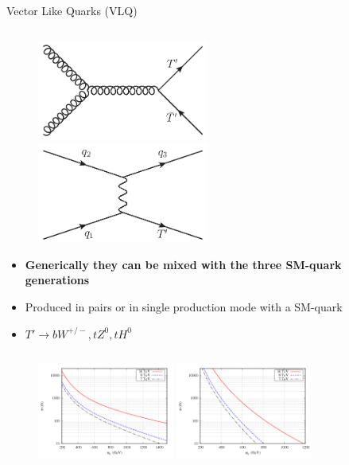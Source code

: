 \begin{frame}{Vector Like Quarks (VLQ)}
\begin{columns}
\begin{column}{.50\textwidth}
\begin{figure}[!Hhtbp]
  \begin{center}
    \includegraphics[width=0.5\textwidth]{../figs/Gluon_fusion_T_pair.jpg}
    \includegraphics[width=0.5\textwidth]{../figs/Tchannel_T_single.jpg}
  \end{center}
\end{figure}
\vspace{-.2cm}
\begin{block}{}
\begin{itemize}\scriptsize
\item \textbf{Generically they can be mixed with the three SM-quark generations}
\item Produced in pairs or in single production mode with a SM-quark
\item $T'\to bW^{+/-}, tZ^{0}, tH^{0}$
\end{itemize}
\end{block}

\end{column}
\end{columns}

\vspace{-.2cm}
\begin{figure}[!Hhtbp]
  \begin{center}
    \includegraphics[width=0.4\textwidth]{../figs/pheno_prod_single_tp.png}
    \includegraphics[width=0.4\textwidth]{../figs/pheno_prod_pair_tp.png}
  \end{center}
\end{figure}


\end{frame}
